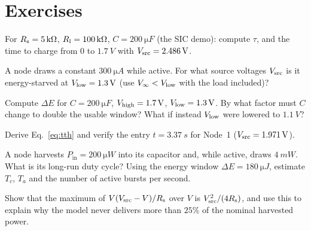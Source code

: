\section*{Exercises}
\begin{exercise}
For $R_{\mathrm{s}}=\SI{5}{k\ohm}$, $R_{\mathrm{l}}=\SI{100}{k\ohm}$, $C=\SI{200}{\micro F}$ (the SIC demo): compute $\tau$, and the time to charge from $0$ to $\SI{1.7}{V}$ with $V_{\mathrm{src}}=\SI{2.486}{V}$.
\end{exercise}
\begin{exercise}
A node draws a constant $\SI{300}{\micro A}$ while active. For what source voltages $V_{\mathrm{src}}$ is it energy-starved at $V_{\mathrm{low}}=\SI{1.3}{V}$ (use $V_\infty<V_{\mathrm{low}}$ with the load included)?
\end{exercise}
\begin{exercise}
Compute $\Delta E$ for $C=\SI{200}{\micro F}$, $V_{\mathrm{high}}=\SI{1.7}{V}$, $V_{\mathrm{low}}=\SI{1.3}{V}$. By what factor must $C$ change to double the usable window? What if instead $V_{\mathrm{low}}$ were lowered to $\SI{1.1}{V}$?
\end{exercise}
\begin{exercise}
Derive Eq.~\eqref{eq:tth} and verify the entry $t=\SI{3.37}{s}$ for Node~1 ($V_{\mathrm{src}}=\SI{1.971}{V}$).
\end{exercise}
\begin{exercise}
A node harvests $P_{\mathrm{in}}=\SI{200}{\micro W}$ into its capacitor and, while active, draws $\SI{4}{mW}$. What is its long-run duty cycle? Using the energy window $\Delta E=\SI{180}{\micro J}$, estimate $T_c$, $T_a$ and the number of active bursts per second.
\end{exercise}
\begin{exercise}
Show that the maximum of $V(V_{\mathrm{src}}-V)/R_{\mathrm{s}}$ over $V$ is $V_{\mathrm{src}}^2/(4R_{\mathrm{s}})$, and use this to explain why the model never delivers more than $25\%$ of the nominal harvested power.
\end{exercise}
